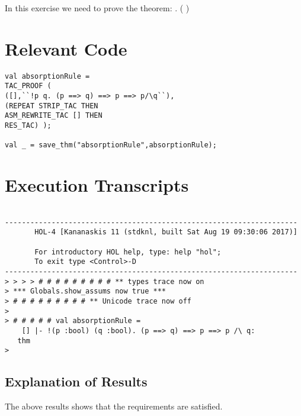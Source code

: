 \documentclass{report}
\begin{document}
In this exercise we need to prove the theorem:
\HOLTokenTurnstile{} \HOLSymConst{\HOLTokenForall{}} . ( \HOLSymConst{\HOLTokenImp{}} ) \HOLSymConst{\HOLTokenImp{}}  \HOLSymConst{\HOLTokenImp{}}  \HOLSymConst{\HOLTokenConj{}} 

\section{Relevant Code}
\label{sec:relevant-code-1}
 \lstset{frameround=fftt}
\begin{lstlisting}[frame=tRBL]
val absorptionRule =
TAC_PROOF (
([],``!p q. (p ==> q) ==> p ==> p/\q``),
(REPEAT STRIP_TAC THEN
ASM_REWRITE_TAC [] THEN
RES_TAC) );

val _ = save_thm("absorptionRule",absorptionRule);

\end{lstlisting}


\section{Execution Transcripts}
\label{sec:exec-transcr-1}

\setcounter{sessioncount}{0}
\begin{session}
  \begin{scriptsize}
\begin{verbatim}

---------------------------------------------------------------------
       HOL-4 [Kananaskis 11 (stdknl, built Sat Aug 19 09:30:06 2017)]

       For introductory HOL help, type: help "hol";
       To exit type <Control>-D
---------------------------------------------------------------------
> > > > # # # # # # # # # ** types trace now on
> *** Globals.show_assums now true ***
> # # # # # # # # # ** Unicode trace now off
> 
> # # # # # val absorptionRule =
    [] |- !(p :bool) (q :bool). (p ==> q) ==> p ==> p /\ q:
   thm
>  
\end{verbatim}
  \end{scriptsize}
\end{session}

\subsection{Explanation of Results}
\label{sec:explanation-results-1}
The above results shows that the requirements are satisfied.
\end{document}
